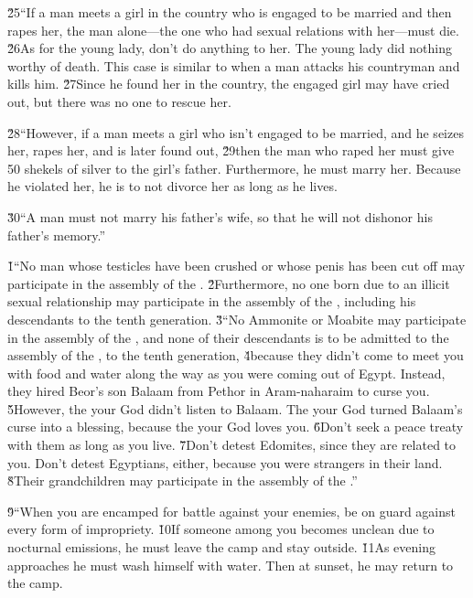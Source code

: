 \v{25}``If a man meets a girl in the country who is engaged to be married and then rapes her, the man alone---the one who had sexual relations with her---must die. \v{26}As for the young lady, don't do anything to her. The young lady did nothing worthy of death. This case is similar to when a man attacks his countryman and kills him. \v{27}Since he found her in the country, the engaged girl may have cried out, but there was no one to rescue her.

\v{28}``However, if a man meets a girl who isn't engaged to be married, and he seizes her, rapes her, and is later found out, \v{29}then the man who raped her must give 50 shekels of silver to the girl's father. Furthermore, he must marry her. Because he violated her, he is to not divorce her as long as he lives.

\v{30}``A man must not marry his father's wife, so that he will not dishonor his father's memory.''

\v{1}``No man whose testicles have been crushed or whose penis has been cut off may participate in the assembly of the . \v{2}Furthermore, no one born due to an illicit sexual relationship may participate in the assembly of the , including his descendants to the tenth generation. \v{3}``No Ammonite or Moabite may participate in the assembly of the , and none of their descendants is to be admitted to the assembly of the , to the tenth generation, \v{4}because they didn't come to meet you with food and water along the way as you were coming out of Egypt. Instead, they hired Beor's son Balaam from Pethor in Aram-naharaim to curse you. \v{5}However, the  your God didn't listen to Balaam. The  your God turned Balaam's curse into a blessing, because the  your God loves you. \v{6}Don't seek a peace treaty with them as long as you live. \v{7}Don't detest Edomites, since they are related to you. Don't detest Egyptians, either, because you were strangers in their land. \v{8}Their grandchildren may participate in the assembly of the .''

\v{9}``When you are encamped for battle against your enemies, be on guard against every form of impropriety. \v{10}If someone among you becomes unclean due to nocturnal emissions, he must leave the camp and stay outside. \v{11}As evening approaches he must wash himself with water. Then at sunset, he may return to the camp.

